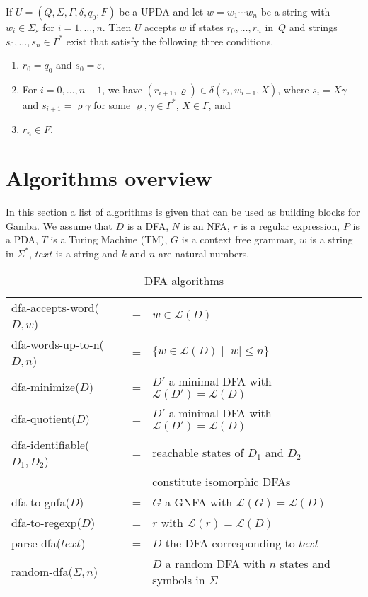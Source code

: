 \documentclass[11pt]{article}
\newcommand*{\Language}[1]{\ensuremath{\mathcal{L}(#1)}}
\begin{document}
\noindent
If $U = (Q, \Sigma, \Gamma, \delta, q_0, F)$ be a UPDA and let $w = w_1 \cdots w_n$ be a string with $w_i \in \Sigma_\varepsilon$ for $i = 1, \ldots, n$. 
Then $U$ accepts $w$ if states $r_0, \ldots, r_n$ in~$Q$ and strings $s_0, \ldots, s_n \in \Gamma^\ast$ exist that satisfy the following three conditions. 
\begin{enumerate}
    \item $r_0 = q_0$ and $s_0 = \varepsilon$,
    \item For $i = 0, \ldots, n {-} 1$, we have $(r_{i+1}, \varrho) \in \delta(r_i, w_{i+1}, X)$, where $s_i = X\gamma$ and $s_{i+1} = \varrho \gamma$ for some $\varrho, \gamma \in \Gamma^\ast$, $X \in \Gamma$, and
    \item $r_n \in F$.
\end{enumerate}

\clearpage
\section{Algorithms overview}
In this section a list of algorithms is given that can be used as building blocks for Gamba. We assume that $D$ is a DFA, $N$ is an NFA, $r$ is a regular expression, $P$ is a PDA, $T$ is a Turing Machine (TM), $G$ is a context free grammar, $w$ is a string in $\Sigma^*$, $text$ is a string and $k$ and $n$ are natural numbers.

\begin{table}[h!]
\begin{tabular}{ |lll| } 
\hline
\textsf{dfa-accepts-word}($D,w$) & = & $w \in \Language{D}$ \\
\textsf{dfa-words-up-to-n}($D,n$) & = & $\{ w \in \Language{D} \mid |w| \leq n \}$ \\
\textsf{dfa-minimize}($D$) & = & $D'$ a minimal DFA with $\Language{D'} = \Language{D}$ \\
\textsf{dfa-quotient}($D$) & = & $D'$ a minimal DFA with $\Language{D'} = \Language{D}$ \\
\textsf{dfa-identifiable}($D_1,D_2$) & = & reachable states of $D_1$ and $D_2$ \\
&& \qquad constitute isomorphic DFAs \\
\textsf{dfa-to-gnfa}($D$) & = & $G$ a GNFA with $\Language{G} = \Language{D}$ \\
\textsf{dfa-to-regexp}($D$) & = & $r$ with $\Language{r} = \Language{D}$ \\
\textsf{parse-dfa}($\mathit{text}$) & = & $D$ the DFA corresponding to $text$ \\
\textsf{random-dfa}($\Sigma, n$) & = & $D$ a random DFA with $n$ states and symbols in $\Sigma$ \\
\hline
\end{tabular}
\caption{DFA algorithms}
\label{table:dfa-algorithms}
\end{table}
\end{document}
